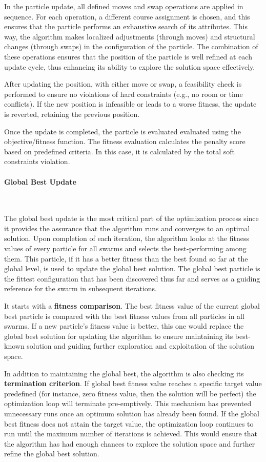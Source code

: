 In the particle update, all defined moves and swap operations are applied in sequence. For each operation, a different course assignment is chosen, and this ensures that the particle performs an exhaustive search of its attributes. This way, the algorithm makes localized adjustments (through moves) and structural changes (through swaps) in the configuration of the particle. The combination of these operations ensures that the position of the particle is well refined at each update cycle, thus enhancing its ability to explore the solution space effectively.
 
After updating the position, with either move or swap, a feasibility check is performed to ensure no violations of hard constraints (e.g., no room or time conflicts). If the new position is infeasible or leads to a worse fitness, the update is reverted, retaining the previous position.

Once the update is completed, the particle is evaluated evaluated using the objective/fitness function. The fitness evaluation calculates the penalty score based on predefined criteria. In this case, it is calculated by the total soft constraints violation.

\paragraph{Global Best Update}\

The global best update is the most critical part of the optimization process since it provides the assurance that the algorithm runs and converges to an optimal solution. Upon completion of each iteration, the algorithm looks at the fitness values of every particle for all swarms and selects the best-performing among them. This particle, if it has a better fitness than the best found so far at the global level, is used to update the global best solution. The global best particle is the fittest configuration that has been discovered thus far and serves as a guiding reference for the swarm in subsequent iterations.

It starts with a \textbf{fitness comparison}. The best fitness value of the current global best particle is compared with the best fitness values from all particles in all swarms. If a new particle's fitness value is better, this one would replace the global best solution for updating the algorithm to ensure maintaining its best-known solution and guiding further exploration and exploitation of the solution space.

In addition to maintaining the global best, the algorithm is also checking its \textbf{termination criterion}. If global best fitness value reaches a specific target value predefined (for instance, zero fitness value, then the solution will be perfect) the optimization loop will terminate pre-emptively. This mechanism has prevented unnecessary runs once an optimum solution has already been found. If the global best fitness does not attain the target value, the optimization loop continues to run until the maximum number of iterations is achieved. This would ensure that the algorithm has had enough chances to explore the solution space and further refine the global best solution.

